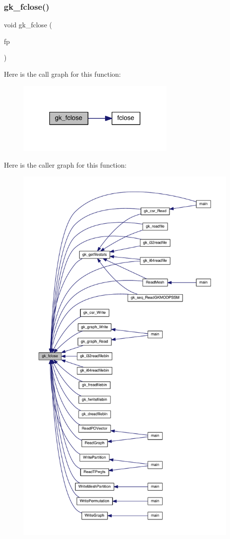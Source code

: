\subsubsection{\texorpdfstring{gk\+\_\+fclose()}{gk\_fclose()}}
{\footnotesize\ttfamily void gk\+\_\+fclose (\begin{DoxyParamCaption}\item[{F\+I\+LE $\ast$}]{fp }\end{DoxyParamCaption})}

Here is the call graph for this function\+:\nopagebreak
\begin{figure}[H]
\begin{center}
\leavevmode
\includegraphics[width=220pt]{a00855_a70dec19fefaf0c84f3948b4679a73fec_cgraph}
\end{center}
\end{figure}
Here is the caller graph for this function\+:\nopagebreak
\begin{figure}[H]
\begin{center}
\leavevmode
\includegraphics[height=550pt]{a00855_a70dec19fefaf0c84f3948b4679a73fec_icgraph}
\end{center}
\end{figure}
